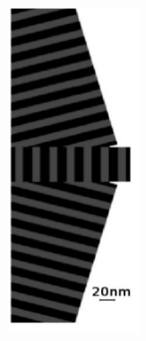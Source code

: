 \documentclass{beamer}
\begin{document}
\begin{frame}
\begin{columns}
\begin{column}{0.5\textwidth}
\begin{figure}[htb]
				\includegraphics[angle=90,width=\textwidth]{../images/multilayer/konc_eps_mgr.png}\\

\end{figure}
\end{column}
\end{columns}
\end{frame}
\end{document}
